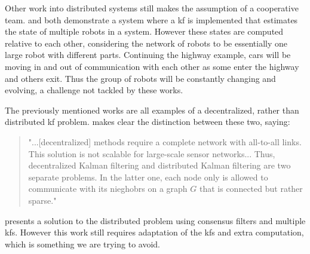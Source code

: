 \documentclass[thesis.tex]{subfile}
\begin{document}
Other work into distributed systems still makes the assumption of a cooperative team. \cite{Sanderson1997} and \cite{Roumeliotis2002} both demonstrate a system where a \gls{kf} is implemented that estimates the state of multiple robots in a system. However these states are computed relative to each other, considering the network of robots to be essentially one large robot with different parts. Continuing the highway example, cars will be moving in and out of communication with each other as some enter the highway and others exit. Thus the group of robots will be constantly changing and evolving, a challenge not tackled by these works.

The previously mentioned works are all examples of a decentralized, rather than distributed \gls{kf} problem. \cite{Olfati-Saber2005} makes clear the distinction between these two, saying:
\begin{quote}"...[decentralized] methods require a complete network with all-to-all links. This solution is not scalable for large-scale sensor networks... Thus, decentralized Kalman filtering and distributed Kalman filtering are two separate problems. In the latter one, each node only is allowed to communicate with its nieghobrs on a graph $G$ that is connected but rather sparse."
\end{quote}
\cite{Olfati-Saber2005} presents a solution to the distributed problem using consensus filters and multiple \glspl{kf}. However this work still requires adaptation of the \glspl{kf} and extra computation, which is something we are trying to avoid.
\end{document}
